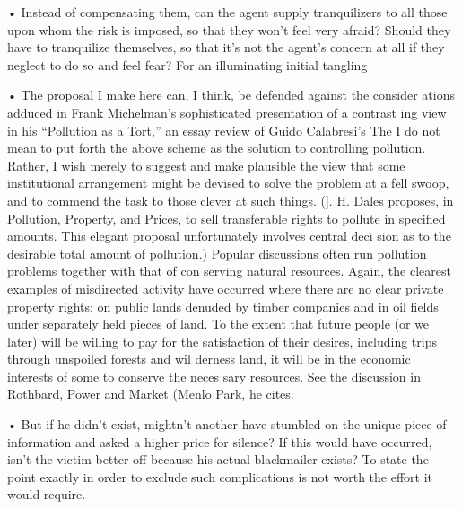 \documentclass[11pt,openany]{book}
\begin{document}
{• Instead of compensating them, can the agent supply tranquilizers to all those upon whom the risk is imposed, so that they won't feel very afraid? Should they have to tranquilize themselves, so that it's not the agent's concern at all if they neglect to do so and feel fear? For an illuminating initial tangling\par

• The proposal I make here can, I think, be defended against the consider ations adduced in Frank Michelman's sophisticated presentation of a contrast ing view in his ``Pollution as a Tort,'' an essay review of Guido Calabresi's The I do not mean to put forth the above scheme as the solution to controlling pollution. Rather, I wish merely to suggest and make plausible the view that some institutional arrangement might be devised to solve the problem at a fell swoop, and to commend the task to those clever at such things. (]. H. Dales proposes, in Pollution, Property, and Prices, to sell transferable rights to pollute in specified amounts. This elegant proposal unfortunately involves central deci sion as to the desirable total amount of pollution.) Popular discussions often run pollution problems together with that of con serving natural resources. Again, the clearest examples of misdirected activity have occurred where there are no clear private property rights: on public lands denuded by timber companies and in oil fields under separately held pieces of land. To the extent that future people (or we later) will be willing to pay for the satisfaction of their desires, including trips through unspoiled forests and wil derness land, it will be in the economic interests of some to conserve the neces sary resources. See the discussion in Rothbard, Power and Market (Menlo Park, he cites.\par

• But if he didn't exist, mightn't another have stumbled on the unique piece of information and asked a higher price for silence? If this would have occurred, isn't the victim better off because his actual blackmailer exists? To state the point exactly in order to exclude such complications is not worth the effort it would require.\par

}
\end{document}
